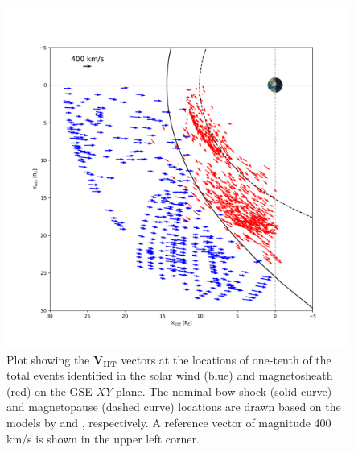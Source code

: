 \begin{figure}
    \centering
    \includegraphics[width=\textwidth]{Figures/Orbits/VHT_xy.png}
    \caption[Orbit plot of flow vectors associated with the SFRs]{Plot showing the $\mathbf{V_{HT}}$ vectors at the locations of one-tenth of the total events identified in the solar wind (blue) and magnetosheath (red) on the GSE-$XY$ plane. The nominal bow shock (solid curve) and magnetopause (dashed curve) locations are drawn based on the models by \citet{Shue:1997} and \citet{SlavinHolzer:1984}, respectively. A reference vector of magnitude 400 km/s is shown in the upper left corner.}
    \label{fig:VHT-xy}
\end{figure}

